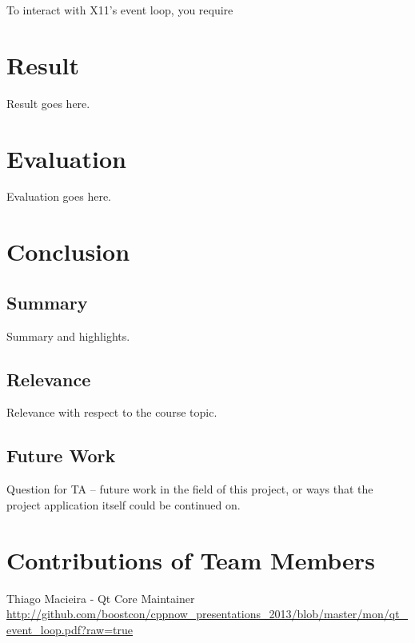 \documentclass[12pt]{article}
\begin{document}
To interact with X11's event loop, you require



	
	\section{Result}
	Result goes here.
	
	\section{Evaluation}
	Evaluation goes here.
	
	\section{Conclusion}
	
	\subsection{Summary}
	Summary and highlights.
	
	\subsection{Relevance}
	Relevance with respect to the course topic.
	
	\subsection{Future Work}
	Question for TA -- future work in the field of this project, or ways that the project application itself could be continued on.
	
	
	\setcounter{secnumdepth}{0}
	\section{Contributions of Team Members}
	
	\begin{thebibliography}{3}
	  Thiago Macieira - Qt Core Maintainer \url{http://github.com/boostcon/cppnow_presentations_2013/blob/master/mon/qt_event_loop.pdf?raw=true}
	\end{thebibliography}{}
\end{document}
